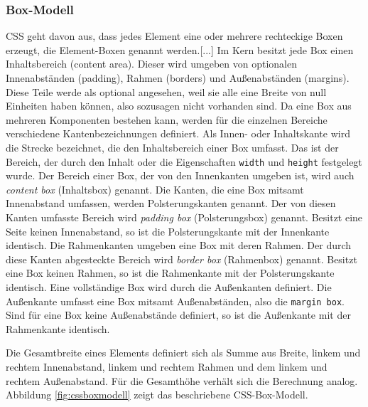 \subsubsection{Box-Modell} \glqq CSS geht davon aus, dass jedes Element eine oder mehrere rechteckige Boxen erzeugt, die Element-Boxen genannt werden.[...] Im Kern besitzt jede Box einen Inhaltsbereich (content area). Dieser wird umgeben von optionalen Innenabständen (padding), Rahmen (borders) und Außenabständen (margins). Diese Teile werde als optional angesehen, weil sie alle eine Breite von null Einheiten haben können, also sozusagen nicht vorhanden sind.\grqq{}\cite[S.167]{MeyeCasc2005} \glqq Da eine Box aus mehreren Komponenten bestehen kann, werden für die einzelnen Bereiche verschiedene Kantenbezeichnungen definiert. Als Innen- oder Inhaltskante wird die Strecke bezeichnet, die den Inhaltsbereich einer Box umfasst. Das ist der Bereich, der durch den Inhalt oder die Eigenschaften \texttt{width} und \texttt{height} festgelegt wurde. Der Bereich einer Box, der von den Innenkanten umgeben ist, wird auch \textit{content box} (Inhaltsbox) genannt. Die Kanten, die eine Box mitsamt Innenabstand umfassen, werden Polsterungskanten genannt. Der von diesen Kanten umfasste Bereich wird \textit{padding box} (Polsterungsbox) genannt. Besitzt eine Seite keinen Innenabstand, so ist die Polsterungskante mit der Innenkante identisch. Die Rahmenkanten umgeben eine Box mit deren Rahmen. Der durch diese Kanten abgesteckte Bereich wird \textit{border box} (Rahmenbox) genannt. Besitzt eine Box keinen Rahmen, so ist die Rahmenkante mit der Polsterungskante identisch. Eine vollständige Box wird durch die Außenkanten definiert. Die Außenkante umfasst eine Box mitsamt Außenabständen, also die \texttt{margin box}. Sind für eine Box keine Außenabstände definiert, so ist die Außenkante mit der Rahmenkante identisch.\grqq{}\cite{SelfHtml20145}\par Die Gesamtbreite eines Elements definiert sich als Summe aus Breite, linkem und rechtem Innenabstand, linkem und rechtem Rahmen und dem linkem und rechtem Außenabstand. Für die Gesamthöhe verhält sich die Berechnung analog. Abbildung \ref{fig:cssboxmodell} zeigt das beschriebene CSS-Box-Modell.

